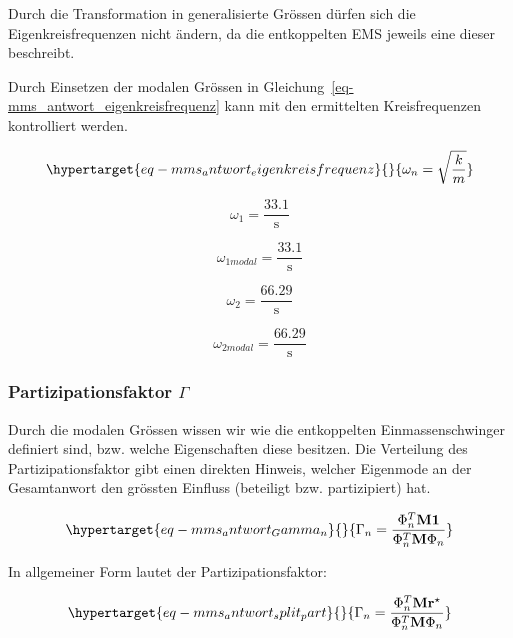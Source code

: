 \documentclass[
  letterpaper,
  DIV=11]{scrreprt}
\begin{document}
Durch die Transformation in generalisierte Grössen dürfen sich die
Eigenkreisfrequenzen nicht ändern, da die entkoppelten EMS jeweils eine
dieser beschreibt.

Durch Einsetzen der modalen Grössen in
Gleichung~\ref{eq-mms_antwort_eigenkreisfrequenz} kann mit den
ermittelten Kreisfrequenzen kontrolliert werden.

\begin{equation}\protect\hypertarget{eq-mms_antwort_eigenkreisfrequenz}{}{
\omega_n = \sqrt{\frac{k}{m}}
}\label{eq-mms_antwort_eigenkreisfrequenz}\end{equation}

\begin{equation}\omega_{1} = \frac{33.1}{\text{s}}\end{equation}

\begin{equation}\omega_{1 modal} = \frac{33.1}{\text{s}}\end{equation}

\begin{equation}\omega_{2} = \frac{66.29}{\text{s}}\end{equation}

\begin{equation}\omega_{2 modal} = \frac{66.29}{\text{s}}\end{equation}

\hypertarget{partizipationsfaktor-gamma-1}{%
\subsubsection{\texorpdfstring{Partizipationsfaktor
\(\Gamma\)}{Partizipationsfaktor \textbackslash Gamma}}\label{partizipationsfaktor-gamma-1}}

Durch die modalen Grössen wissen wir wie die entkoppelten
Einmassenschwinger definiert sind, bzw. welche Eigenschaften diese
besitzen. Die Verteilung des Partizipationsfaktor gibt einen direkten
Hinweis, welcher Eigenmode an der Gesamtanwort den grössten Einfluss
(beteiligt bzw. partizipiert) hat.

\begin{equation}\protect\hypertarget{eq-mms_antwort_Gamma_n}{}{
\Gamma_n = \frac{\Phi_n^T \mathbf{M 1}}{\Phi_n^T \mathbf{M}\Phi_n}
}\label{eq-mms_antwort_Gamma_n}\end{equation}

In allgemeiner Form lautet der Partizipationsfaktor:

\begin{equation}\protect\hypertarget{eq-mms_antwort_split_part}{}{
\Gamma_n = \frac{\Phi_n^T \mathbf{M r^\star}}{\Phi_n^T \mathbf{M}\Phi_n}
}\label{eq-mms_antwort_split_part}\end{equation}
\end{document}
